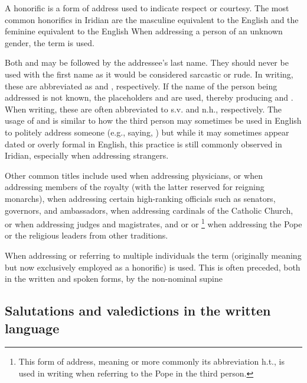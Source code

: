 A {\sc honorific} is a form of address used to indicate respect or courtesy. The most common honorifics in
Iridian are the masculine  equivalent to the English  and the feminine
 equivalent to the English  When addressing a person of an unknown
gender, the term  is used.

Both  and  may be followed by the addressee's last name. They should never be used with
the first name as it would be considered sarcastic or rude. In writing, these are abbreviated as 
and , respectively. If the name of the person being addressed is not
known, the placeholders  and  are used, thereby producing 
and . When writing, these are often abbreviated to {\sc s.v.} and {\sc n.h.}, respectively.
The usage of  and  is similar to how the third person may sometimes be used
in English to politely address someone (e.g., saying, ) but while
it may sometimes appear dated or overly formal in English, this practice is still commonly observed
in Iridian, especially when addressing strangers.

Other common titles include  used when addressing physicians,  or 
when addressing members of the royalty (with the latter reserved for reigning monarchs),  when
addressing certain high-ranking officials such as senators, governors, and ambassadors,  when addressing
cardinals of the Catholic Church,  or  when addressing judges and magistrates, and
 or  or \footnote{This form of address, meaning
 or more commonly its abbreviation {\sc h.t.}, is used in writing when referring to the Pope in the
third person.} when addressing the Pope or the religious leaders from other traditions.

When addressing or referring to multiple individuals the term  (originally meaning 
but now exclusively employed as a honorific) is used. This is often preceded, both in the written and spoken forms,
by the non-nominal supine 

\subsection{Salutations and valedictions in the written language}

